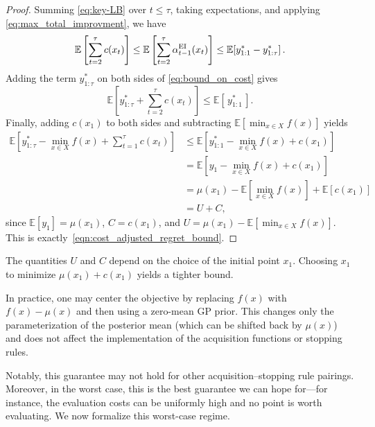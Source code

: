 \begin{proof}
Summing \eqref{eq:key-LB} over $t\leq\tau$, taking expectations, and applying \eqref{eq:max_total_improvment}, we have
\begin{equation}
\mathbb{E}\left[\sum_{t=2}^{\tau}c(x_t)\right]
      \le
\mathbb{E}\left[\sum_{t=2}^{\tau}\alpha_{t-1}^{\mathrm{EI}}(x_t)\right]
      \le \E\!\left[y^*_{1:1} - y^*_{1:\tau}\right]. \label{eq:bound_on_cost} %
\end{equation}
Adding the term $y^*_{1:\tau}$ on both sides of \eqref{eq:bound_on_cost} gives
\[
\mathbb{E}\!\left[y^*_{1:\tau}+\sum_{t=2}^{\tau} c(x_t)\right]
\le \mathbb{E}[\,y^*_{1:1}\,].
\]
Finally, adding $c(x_1)$ to both sides and subtracting $\mathbb{E}\!\left[\min_{x\in X} f(x)\right]$ yields
\begin{align*}
\mathbb{E}\!\left[y^*_{1:\tau}-\min_{x\in X} f(x)+\sum_{t=1}^{\tau} c(x_t)\right]
&\le
\mathbb{E}\!\left[y^*_{1:1}-\min_{x\in X} f(x)+c(x_1)\right]
\\
&=
\mathbb{E}\!\left[y_1-\min_{x\in X} f(x)+c(x_1)\right]
\\
&=
\mu(x_1) - \mathbb{E}\!\left[\min_{x\in X} f(x)\right] + \mathbb{E}[c(x_1)] \\
&= U+C,
\end{align*}
since $\mathbb{E}[y_1]=\mu(x_1)$, $C=c(x_1)$, and $U=\mu(x_1) - \mathbb{E}\left[\min_{x\in X} f(x)\right]$. This is exactly~\eqref{eqn:cost_adjusted_regret_bound}.
\end{proof}

\begin{remark}
    The quantities $U$ and $C$ depend on the choice of the initial point $x_1$. Choosing $x_1$ to minimize $\mu(x_1)+c(x_1)$ yields a tighter bound.
\end{remark}

\begin{remark}
In practice, one may center the objective by replacing $f(x)$ with $f(x) - \mu(x)$ 
and then using a zero-mean GP prior.  
This changes only the parameterization of the posterior mean (which can be shifted back by $\mu(x)$) 
and does not affect the implementation of the acquisition functions or stopping rules.
\end{remark}

Notably, this guarantee may not hold for other acquisition–stopping rule pairings. Moreover, in the worst case, this is the best guarantee we can hope for---for instance, the evaluation costs can be uniformly high and no point is worth evaluating.
We now formalize this worst-case regime.


